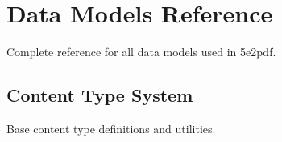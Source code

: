 \documentclass[letterpaper,10pt,english]{sphinxmanual}
\begin{document}
\sphinxstepscope


\section{Data Models Reference}
\label{\detokenize{api/models:data-models-reference}}\label{\detokenize{api/models::doc}}
\sphinxAtStartPar
Complete reference for all data models used in 5e2pdf.


\subsection{Content Type System}
\label{\detokenize{api/models:content-type-system}}
\sphinxAtStartPar
Base content type definitions and utilities.
\end{document}
